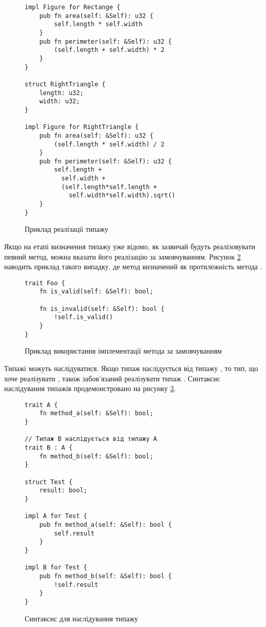 \documentclass[main.tex]{subfiles}
\begin{document}
\begin{figure}[h]
  \centering
  \begin{verbatim}
impl Figure for Rectange {
    pub fn area(self: &Self): u32 {
        self.length * self.width
    }
    pub fn perimeter(self: &Self): u32 {
        (self.length + self.width) * 2
    }
}

struct RightTriangle {
    length: u32;
    width: u32;
}

impl Figure for RightTriangle {
    pub fn area(self: &Self): u32 {
        (self.length * self.width) / 2
    }
    pub fn perimeter(self: &Self): u32 {
        self.length +
          self.width +
          (self.length*self.length +
            self.width*self.width).sqrt()
    }
}
  \end{verbatim}
  \caption{Приклад реалізації типажу}
  \label{lang:trait-implementation}
\end{figure}

Якщо на етапі визначення типажу уже відомо, як зазвичай будуть реалізовувати певний метод, можна вказати його реалізацію за замовчуванням.
Рисунок \ref{lang:trait-default} наводить приклад такого випадку, де метод  визначений як протилежність метода .

\begin{figure}[h]
  \centering
  \begin{verbatim}
trait Foo {
    fn is_valid(self: &Self): bool;

    fn is_invalid(self: &Self): bool {
        !self.is_valid()
    }
}
  \end{verbatim}
  \caption{Приклад використання імплементації метода за замовчуванням}
  \label{lang:trait-default}
\end{figure}

Типажі можуть наслідуватися. Якщо типаж  наслідується від типажу , то тип, що хоче реалізувати , також забов'язаний реалізувати типаж . Синтаксис наслідування типажів продемонстровано на рисунку \ref{lang:trait-inheritance}.

\begin{figure}[h]
  \centering
  \begin{verbatim}
trait A {
    fn method_a(self: &Self): bool;
}

// Типаж B наслідується від типажу A
trait B : A {
    fn method_b(self: &Self): bool;
}

struct Test {
    result: bool;
}

impl A for Test {
    pub fn method_a(self: &Self): bool {
        self.result
    }
}

impl B for Test {
    pub fn method_b(self: &Self): bool {
        !self.result
    }
}
  \end{verbatim}
  \caption{Синтаксис для наслідування типажу}
  \label{lang:trait-inheritance}
\end{figure}
\end{document}
